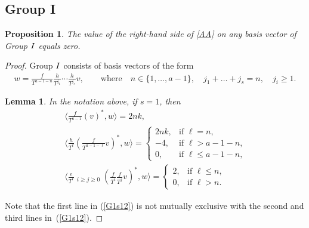 \documentclass[11pt]{article}
\numberwithin{equation}{section}
\newtheorem{lem}[thm]{Lemma}
\newtheorem{prop}[thm]{Proposition}
{\theoremstyle{definition}
\newtheorem*{rem}{Remark}}
\begin{document}
\subsection{Group I}
\begin{prop}\label{Pr3}The value of the right-hand side of \eqref{AA} on any basis vector of Group ${\rm I}$ equals zero.
\end{prop}
\begin{proof}Group ${\rm I}$ consists of basis vectors of the form
\begin{gather*}
w = \frac{f}{T^{a-1-n}}\frac{h}{T^{j_1}} \cdots \frac{h}{T^{j_s}} v, \qquad \text{where} \quad
n \in \{1, \dots, a-1 \},\quad j_1 + \dots + j_s = n, \quad j_i \geq 1.
\end{gather*}

\begin{lem}\label{Group 3, s=1} In the notation above, if $s =1$, then
\begin{gather}
\bigg\langle \frac{f}{T^{a-1}} (v)^*, w \bigg\rangle = 2 n k, \nonumber\\ %
\bigg\langle \frac{h}{T^{\ell}} \left(\frac{f}{T^{a-1-\ell}}v\right)^*, w \bigg\rangle = \begin{cases}
 2 n k, & \text{if $\ell=n$,}\\
 - 4, & \text{if $\ell > a-1-n$,} \\
 0, & \text{if $\ell \leq a-1-n$,}
 \end{cases} \label{G1s12}
\\
\bigg\langle \frac{e}{T^{\ell}} \mathop{\sum_{i+j=a-1-\ell}}_{i\geq j\geq 0} \left(\frac{f}{T^i}\frac{f}{T^j}v\right)^*, w \bigg\rangle =
 \begin{cases}
 2, & \text{if $\ell \leq n$,}\\
 0, & \text{if $\ell > n$. }
 \end{cases} \nonumber %
\end{gather}
\end{lem}

Note that the first line in (\ref{G1s12}) is not mutually exclusive with the second and third lines in~(\ref{G1s12}).


\end{proof}
\end{document}
